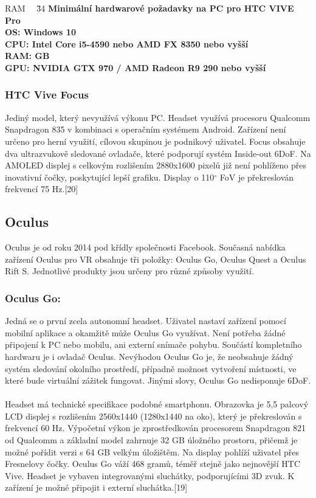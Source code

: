 \documentclass[a4paper, 12pt]{report}
\begin{document}
\begin{tabbing}
    RAM ~~\= 
    \= 34 \kill
    \bfseries Minimální hardwarové požadavky na PC pro HTC VIVE Pro \> \\[1mm]
    OS: \> Windows 10\\
    CPU: \> Intel Core i5-4590 nebo AMD FX 8350 nebo vyšší\\
    RAM:  GB\\
    GPU: \> NVIDIA GTX 970 / AMD Radeon R9 290 nebo vyšší\\
    \end{tabbing}

\subsubsection{HTC Vive Focus} Jediný model, který nevyužívá výkonu PC. Headset využívá procesoru Qualcomm Snapdragon 835 v kombinaci s operačním systémem Android. Zařízení není určeno pro herní využití, cílovou skupinou je podnikový uživatel. Focus obsahuje dva ultrazvukově sledované ovladače, které podporují systém Inside-out 6DoF. Na AMOLED displej s celkovým rozlišením 2880x1600 pixelů již není pohlíženo přes inovativní čočky, poskytující lepší grafiku. Display o 110$^\circ$ FoV je překreslován frekvencí 75 Hz.[20]

\subsection{Oculus}
Oculus je od roku 2014 pod křídly společnosti Facebook. Současná nabídka zařízení Oculus pro VR obsahuje tři položky: Oculus Go, Oculus Quest a Oculus Rift S. Jednotlivé produkty jsou určeny pro různé způsoby využití.\\

\subsubsection{Oculus Go:} Jedná se o první zcela autonomní headset. Uživatel nastaví zařízení pomocí mobilní aplikace a okamžitě může Oculus Go využívat. Není potřeba žádné připojení k PC nebo mobilu, ani externí snímače pohybu. Součástí kompletního hardwaru je i ovladač Oculus. Nevýhodou Oculus Go je, že neobsahuje žádný systém sledování okolního prostředí, případně možnost vytvoření místnosti, ve které bude virtuální zážitek fungovat. Jinými slovy, Oculus Go nedisponuje 6DoF.\\
\\
Headset má technické specifikace podobné smartphonu. Obrazovka je 5,5 palcový LCD displej s rozlišením 2560x1440 (1280x1440 na oko), který je překreslován s frekvencí 60 Hz. Výpočetní výkon je zprostředkován procesorem Snapdragon 821 od Qualcomm a základní model zahrnuje 32 GB úložného prostoru, přičemž je možné pořídit verzi s 64 GB velkým úložištěm. Na display pohlíží uživatel přes Fresnelovy čočky. Oculus Go váží 468 gramů, téměř stejně jako nejnovější HTC Vive. Headset je vybaven integrovanými sluchátky, podporujícími 3D zvuk. K zařízení je možné připojit i externí sluchátka.[19]\\
\end{document}
